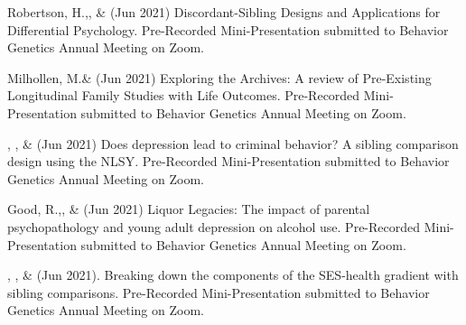 
\item Robertson, H.,\noteA \Joe, \&  \meb (Jun 2021) Discordant-Sibling Designs and Applications for Differential Psychology. Pre-Recorded Mini-Presentation submitted to Behavior Genetics Annual Meeting on Zoom.

\item Milhollen, M.\noteA \&  \meb (Jun 2021) Exploring the Archives: A review of Pre-Existing Longitudinal Family Studies with Life Outcomes. Pre-Recorded Mini-Presentation submitted to Behavior Genetics Annual Meeting on Zoom.

\item \emsims, \jt,  \&  \meb (Jun 2021) Does depression lead to criminal behavior? A sibling comparison design using the NLSY. Pre-Recorded Mini-Presentation submitted to Behavior Genetics Annual Meeting on Zoom.
%
\item Good, R.,\noteA \yrh, \&  \meb (Jun 2021) Liquor Legacies: The impact of parental psychopathology and young adult depression on alcohol use. Pre-Recorded Mini-Presentation submitted to Behavior Genetics Annual Meeting on Zoom.
%
\item \yrh, \jt, \& \meb (Jun 2021). Breaking down the components of the SES-health gradient with sibling comparisons. Pre-Recorded Mini-Presentation submitted to Behavior Genetics Annual Meeting on Zoom.
